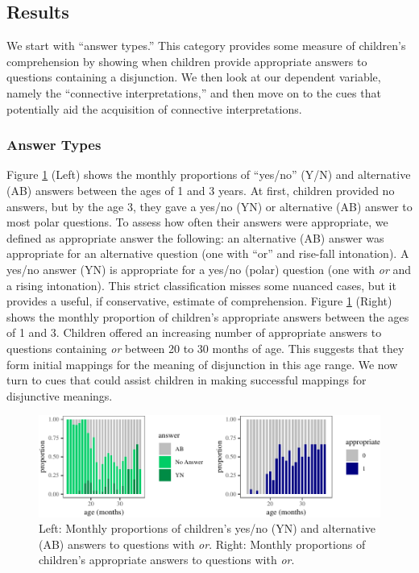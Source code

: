 \documentclass[
  english,
  ,man,floatsintext]{apa6}
\begin{document}
\hypertarget{results}{%
\subsection{Results}\label{results}}

We start with ``answer types.'' This category provides some measure of children's comprehension by showing when children provide appropriate answers to questions containing a disjunction. We then look at our dependent variable, namely the ``connective interpretations,'' and then move on to the cues that potentially aid the acquisition of connective interpretations.

\hypertarget{answer-types}{%
\subsubsection{Answer Types}\label{answer-types}}

Figure \ref{fig:answerPlot} (Left) shows the monthly proportions of ``yes/no'' (Y/N) and alternative (AB) answers between the ages of 1 and 3 years. At first, children provided no answers, but by the age 3, they gave a yes/no (YN) or alternative (AB) answer to most polar questions. To assess how often their answers were appropriate, we defined as appropriate answer the following: an alternative (AB) answer was appropriate for an alternative question (one with ``or'' and rise-fall intonation). A yes/no answer (YN) is appropriate for a yes/no (polar) question (one with \emph{or} and a rising intonation). This strict classification misses some nuanced cases, but it provides a useful, if conservative, estimate of comprehension. Figure \ref{fig:answerPlot} (Right) shows the monthly proportion of children's appropriate answers between the ages of 1 and 3. Children offered an increasing number of appropriate answers to questions containing \emph{or} between 20 to 30 months of age. This suggests that they form initial mappings for the meaning of disjunction in this age range. We now turn to cues that could assist children in making successful mappings for disjunctive meanings.

\begin{figure}[tb]

{\centering \includegraphics{figs/answerPlot-1} 

}

\caption{Left: Monthly proportions of children's yes/no (YN) and alternative (AB) answers to questions with \textit{or}. Right: Monthly proportions of children's appropriate answers to questions with \textit{or}.}\label{fig:answerPlot}
\end{figure}
\end{document}
